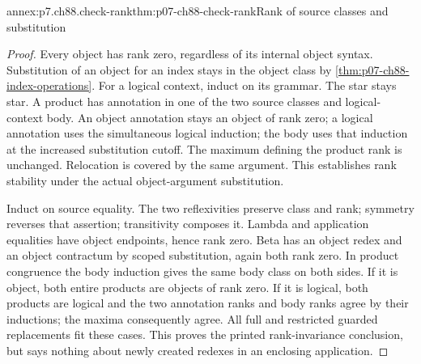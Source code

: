 \begin{annexitem}{annex:p7.ch88.check-rank}{thm:p07-ch88-check-rank}{Rank of source classes and substitution}
\begin{proof}
Every object has rank zero, regardless of its internal object syntax.
Substitution of an object for an index stays in the object class by
\cref{thm:p07-ch88-index-operations}. For a logical context, induct on
its grammar. The star stays star. A product has annotation in one of
the two source classes and logical-context body. An object annotation
stays an object of rank zero; a logical annotation uses the simultaneous
logical induction; the body uses that induction at the increased
substitution cutoff. The maximum defining the product rank is unchanged.
Relocation is covered by the same argument. This establishes rank
stability under the actual object-argument substitution.

Induct on source equality. The two reflexivities preserve class and
rank; symmetry reverses that assertion; transitivity composes it.
Lambda and application equalities have object endpoints, hence rank
zero. Beta has an object redex and an object contractum by scoped
substitution, again both rank zero. In product congruence the body
induction gives the same body class on both sides. If it is object,
both entire products are objects of rank zero. If it is logical,
both products are logical and the two annotation ranks and body ranks
agree by their inductions; the maxima consequently agree. All full
and restricted guarded replacements fit these cases. This proves the
printed rank-invariance conclusion, but says nothing about newly
created redexes in an enclosing application.
\end{proof}
\end{annexitem}

